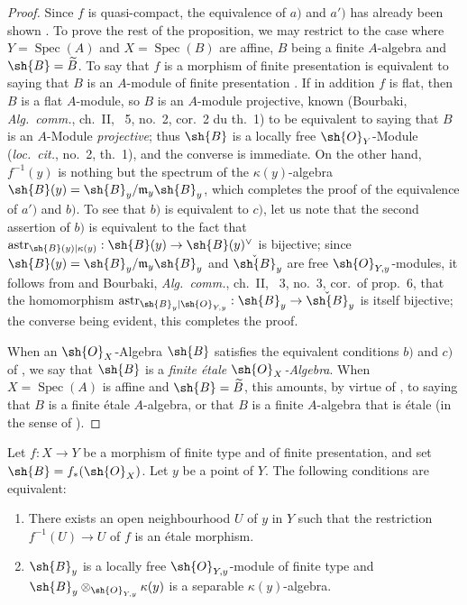 \begin{proof}
Since $f$ is quasi-compact, the equivalence of $a)$ and $a')$ has already been shown .
To prove the rest of the proposition, we may restrict to the case where $Y=\operatorname{Spec}(A)$ and $X=\operatorname{Spec}(B)$ are affine, $B$ being a finite $A$-algebra and $\sh{B}=\widetilde{B}$.
To say that $f$ is a morphism of finite presentation is equivalent to saying that $B$ is an $A$-module of finite presentation .
If in addition $f$ is flat, then $B$ is a flat $A$-module, so $B$ is an $A$-module projective, known (Bourbaki, \emph{Alg.\ comm.}, ch.~II, \textsection~5, no.~2, cor.~2 du th.~1) to be equivalent to saying that $B$ is an $A$-Module \emph{projective};
thus $\sh{B}$ is a locally free $\sh{O}_Y$-Module (\emph{loc.\ cit.}, no.~2, th.~1), and the converse is immediate.
On the other hand, $f^{-1}(y)$ is nothing but the spectrum of the $\kappa(y)$-algebra $\sh{B}(y)=\sh{B}_y/\mathfrak{m}_y\sh{B}_y$, which completes the proof of the equivalence of $a')$ and $b)$.
To see that $b)$ is equivalent to $c)$, let us note that the second assertion of $b)$ is equivalent to the fact that $\operatorname{astr}_{\sh{B}(y)|\kappa(y)}:\sh{B}(y)\to\sh{B}(y)^\vee$ is bijective;
since $\sh{B}(y)=\sh{B}_y/\mathfrak{m}_y\sh{B}_y$ and $\check{\sh{B}}_y$ are free $\sh{O}_{Y,y}$-modules, it follows from  and Bourbaki, \emph{Alg.\ comm.}, ch.~II, \textsection~3, no.~3, cor.\ of prop.~6, that the homomorphism $\operatorname{astr}_{\sh{B}_y|\sh{O}_{Y,y}}:\sh{B}_y\to\check{\sh{B}}_y$ is itself bijective;
the converse being evident, this completes the proof.

When an $\sh{O}_X$-Algebra $\sh{B}$ satisfies the equivalent conditions $b)$ and $c)$ of , we say that $\sh{B}$ is a \emph{finite \'etale $\sh{O}_X$-Algebra}.
When $X=\operatorname{Spec}(A)$ is affine and $\sh{B}=\widetilde{B}$, this amounts, by virtue of , to saying that $B$ is a finite \'etale $A$-algebra, or that $B$ is a finite $A$-algebra that is \'etale (in the sense of ).
\end{proof}

\begin{corollary}[18.2.4]
\label{IV.18.2.4}
Let $f:X\to Y$ be a morphism of finite type and of finite presentation, and set $\sh{B}=f_*(\sh{O}_X)$.
Let $y$ be a point of $Y$.
The following conditions are equivalent:
\begin{enumerate}[label=\emph{\alph*)}]
  \item There exists an open neighbourhood $U$ of $y$ in $Y$ such that the restriction $f^{-1}(U)\to U$ of $f$ is an \'etale morphism.
  \item $\sh{B}_y$ is a locally free $\sh{O}_{Y,y}$-module of finite type and $\sh{B}_y\otimes_{\sh{O}_{Y,y}}\kappa(y)$ is a separable $\kappa(y)$-algebra.
\end{enumerate}
\end{corollary}


